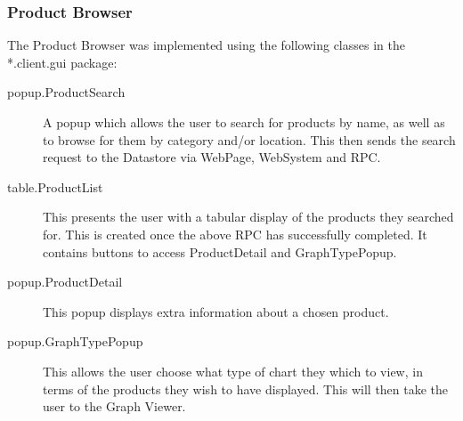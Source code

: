 \subsubsection{Product Browser}
The Product Browser was implemented using the following classes in the *.client.gui package:
\begin{description}
\item[popup.ProductSearch] A popup which allows the user to search for products by name, as well as to browse for them by category and/or location. This then sends the search request to the Datastore via WebPage, WebSystem and RPC.
\item[table.ProductList] This presents the user with a tabular display of the products they searched for. This is created once the above RPC has successfully completed. It contains buttons to access ProductDetail and GraphTypePopup.
\item[popup.ProductDetail] This popup displays extra information about a chosen product.
\item[popup.GraphTypePopup] This allows the user choose what type of chart they which to view, in terms of the products they wish to have displayed. This will then take the user to the Graph Viewer.
\end{description} 

